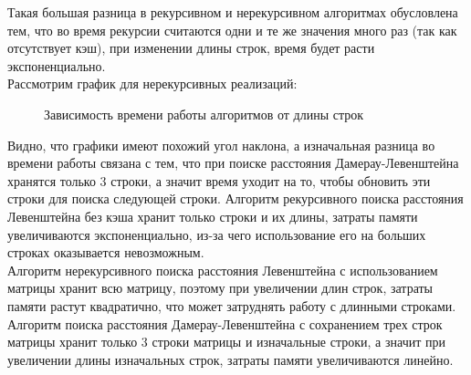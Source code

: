 \documentclass[12pt, a4paper]{article}
\begin{document}
Такая большая разница в рекурсивном и нерекурсивном 
алгоритмах обусловлена тем, что во время 
рекурсии считаются одни и те же значения много 
раз (так как отсутствует кэш), при изменении длины 
строк, время будет расти экспоненциально. \\
Рассмотрим график для нерекурсивных реализаций:
\newpage
\begin{figure}[h]
  \caption{Зависимость времени работы алгоритмов от длины строк}
  \label{img:algLevNRMatr and alg DL3str}
\end{figure}
Видно, что графики имеют похожий угол наклона, а изначальная 
разница во времени работы связана с тем, что при поиске
расстояния  Дамерау-Левенштейна хранятся только 3 строки, 
а значит время уходит на то, чтобы обновить эти строки для 
поиска следующей строки. Алгоритм рекурсивного поиска
расстояния Левенштейна без кэша хранит только строки и их
длины, затраты памяти увеличиваются экспоненциально, из-за 
чего использование его на больших строках оказывается 
невозможным.\\
Алгоритм нерекурсивного поиска расстояния Левенштейна с
использованием матрицы хранит всю матрицу, поэтому при 
увеличении длин строк, затраты памяти растут квадратично, что 
может затруднять работу с длинными строками. \\
Алгоритм поиска расстояния  Дамерау-Левенштейна с 
сохранением трех строк матрицы хранит только 3 строки матрицы 
и изначальные строки, а значит при увеличении длины 
изначальных строк, затраты памяти увеличиваются линейно.
\newpage
\end{document}
